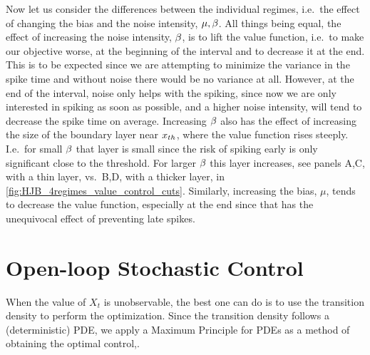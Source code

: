 \documentclass{article}
\begin{document}
Now let us consider the differences between the individual regimes, i.e.\ the
effect of changing the bias and the noise intensity, ${\mu },{\beta}$. All things being
equal, the effect of increasing the noise intensity, ${\beta}$, is to lift the value
function, i.e.\ to make our objective worse, at the beginning of the interval
and to decrease it at the end. This is to be expected since we are attempting
to minimize the variance in the spike time and without noise there would be no
variance at all. However, at the end of the interval, noise only helps with the
spiking, since now we are only interested in spiking as soon as possible, and a
higher noise intensity, will tend to decrease the spike time on average.
Increasing ${\beta}$ also has the effect of increasing the size of the boundary layer
near ${ x_{th} }$, where the value function rises steeply. I.e.\ for small ${\beta}$ that
layer is small since the risk of spiking early is only significant close to
the threshold. For larger ${\beta}$ this layer increases, see panels A,C, with a thin
layer, vs.\ B,D, with a thicker layer, in
\cref{fig:HJB_4regimes_value_control_cuts}. Similarly, increasing the bias,
$\mu$, tends to decrease the value function, especially at the end since that
has the unequivocal effect of preventing late spikes.
\clearpage

\section{Open-loop Stochastic Control}
When the value of $X_t$ is unobservable, the best
one can do is to use the transition density to perform the optimization. Since the
transition density follows a (deterministic) PDE, we apply a Maximum
Principle for PDEs as a method of obtaining the optimal control,\cite{Borzi2012}.
\end{document}
